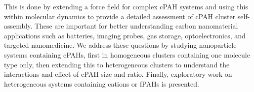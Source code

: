 This is done by extending a force field for complex cPAH systems and using this within molecular dynamics to provide a detailed assessment of cPAH cluster self-assembly.
These are important for better understanding carbon nanomaterial applications such as batteries, imaging probes, gas storage, optoelectronics, and targeted nanomedicine.
We address these questions by studying nanoparticle systems containing cPAHs, first in homogeneous clusters containing one molecule type only, then extending this to heterogeneous clusters to understand the interactions and effect of cPAH size and ratio. Finally, exploratory work on heterogeneous systems containing cations or fPAHs is presented. %



